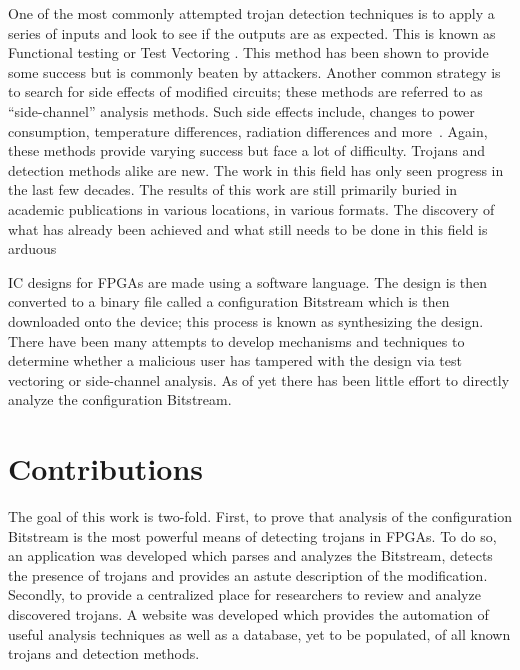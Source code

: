 One of the most commonly attempted trojan detection techniques is to apply a series of inputs and look to see if the outputs are as expected.
This is known as Functional testing or Test Vectoring \cite{kSubset,monteCarloTestPattern,towardsDetectionMethodology}.
This method has been shown to provide some success but is commonly beaten by attackers.
Another common strategy is to search for side effects of modified circuits; these methods are referred to as ``side-channel'' analysis methods.
Such side effects include, changes to power consumption, temperature differences, radiation differences and more~\cite{sideChannelObfuscation, postLayout, controllableSleepTransistors, pcaAlgorithm}.
Again, these methods provide varying success but face a lot of difficulty.
Trojans and detection methods alike are new.
The work in this field has only seen progress in the last few decades.
The results of this work are still primarily buried in academic publications in various locations, in various formats.
The discovery of what has already been achieved and what still needs to be done in this field is arduous 

\acrshort{IC} designs for \acrfull{FPGAs} are made using a software language.
The design is then converted to a binary file called a configuration \gls{Bitstream} which is then downloaded onto the device; this process is known as synthesizing the design.
There have been many attempts to develop mechanisms and techniques to determine whether a malicious user has tampered with the design via test vectoring or side-channel analysis.
As of yet there has been little effort to directly analyze the configuration \gls{Bitstream}.


\section{Contributions}
The goal of this work is two-fold.
First, to prove that analysis of the configuration \gls{Bitstream} is the most powerful means of detecting trojans in \acrshort{FPGA}s.
To do so, an application was developed which parses and analyzes the \gls{Bitstream}, detects the presence of trojans and provides an astute description of the modification.
Secondly, to provide a centralized place for researchers to review and analyze discovered trojans.
A website was developed which provides the automation of useful analysis techniques as well as a database, yet to be populated, of all known trojans and detection methods. 

